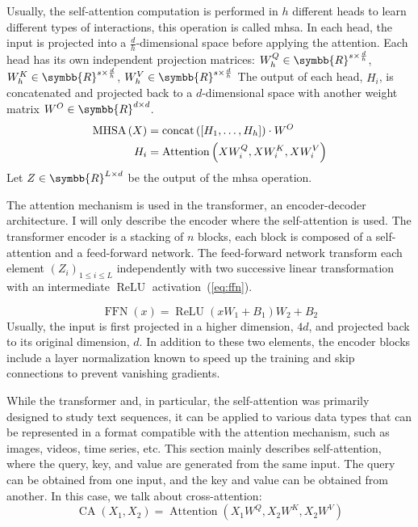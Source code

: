 \documentclass[../main.tex]{subfiles}
\begin{document}
	 Usually, the self-attention computation is performed in \(h\) different heads to learn different types of interactions, this operation is called \gls{mhsa}.
	 In each head, the input is projected into a \(\frac{d}{h}\)-dimensional space before applying the attention.
	 Each head has its own independent projection matrices: \(W^Q_h \in \symbb{R}^{s \times \frac{d}{h}}\), \(W^K_h \in \symbb{R}^{s \times \frac{d}{h}}\), \(W^V_h \in \symbb{R}^{s \times \frac{d}{h}}\)
	 The output of each head, \(H_i\), is concatenated and projected back to a \(d\)-dimensional space with another weight matrix \(W^O \in \symbb{R}^{d \times d}\).
	 \begin{align}
		 \operatorname{MHSA}\left(X\right) & = \operatorname{concat}\left(\left[H_1, \ldots, H_h \right] \right)\cdot W^O \\
		 H_i                 & = \operatorname{Attention}\left(XW^Q_i, XW^K_i, XW^V_i\right)
	 \end{align}
	 Let \(Z \in \symbb{R}^{L \times d}\) be the output of the \gls{mhsa} operation.

	 The attention mechanism is used in the transformer, an encoder-decoder architecture.
	 I will only describe the encoder where the self-attention is used.
	 The transformer encoder is a stacking of \(n\) blocks, each block is composed of a self-attention and a feed-forward network.
	 The feed-forward network transform each element \({\left(Z_i\right)}_{1 \leq i \leq L}\) independently with two successive linear transformation with an intermediate \(\operatorname{ReLU}\) activation~(\cref{eq:ffn}).

	 \begin{equation}
		 \operatorname{FFN}\left(x\right) = \operatorname{ReLU}\left(xW_1 + B_1\right)W_2 + B_2 \label{eq:ffn}
	 \end{equation}
	 Usually, the input is first projected in a higher dimension, \(4d\), and projected back to its original dimension, \(d\).
	 In addition to these two elements, the encoder blocks include a layer normalization known to speed up the training and skip connections to prevent vanishing gradients.

	 While the transformer and, in particular, the self-attention was primarily designed to study text sequences, it can be applied to various data types that can be represented in a format compatible with the attention mechanism, such as images, videos, time series, etc.
	 This section mainly describes self-attention, where the query, key, and value are generated from the same input.
	 The query can be obtained from one input, and the key and value can be obtained from another.
	 In this case, we talk about cross-attention:
	 \begin{equation}
		\operatorname{CA}\left(X_1, X_2 \right) = \operatorname{Attention} \left(X_1W^Q, X_2W^K, X_2W^V\right) \label{eq:cross_attention}
	 \end{equation}
\end{document}
